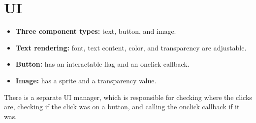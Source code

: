 \section{UI}
\begin{itemize}
    \item \textbf{Three component types:} text, button, and image.
    \item \textbf{Text rendering:} font, text content, color, and transparency are adjustable.
    \item \textbf{Button:} has an interactable flag and an onclick callback.
    \item \textbf{Image:} has a sprite and a transparency value.
\end{itemize}

\noindent
There is a separate UI manager, which is responsible for checking where the clicks are, checking if the click was on a button, and calling the onclick callback if it was.